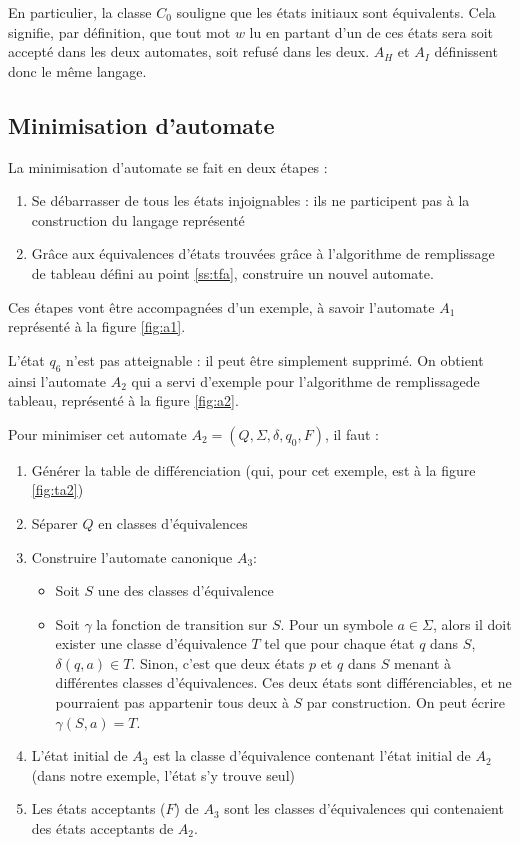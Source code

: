 	 En particulier, la classe $C_0$ souligne que les états initiaux sont équivalents. Cela signifie, par définition, que tout mot $w$ lu en partant d'un de ces états sera soit accepté dans les deux automates, soit refusé dans les deux. $A_H$ et $A_I$ définissent donc le même langage.
	 
	 
	 \subsection{Minimisation d'automate}\label{ss:miniauto}
	 
	 La minimisation d'automate se fait en deux étapes :
	 \begin{enumerate}
	 	\item Se débarrasser de tous les états injoignables : ils ne participent pas à la construction du langage représenté
	 	\item Grâce aux équivalences d'états trouvées grâce à l'algorithme de remplissage de tableau défini au point \ref{ss:tfa}, construire un nouvel automate. 
	 \end{enumerate}
	 
	 Ces étapes vont être accompagnées d'un exemple, à savoir l'automate $A_1$ représenté à la figure \ref{fig:a1}.
	 
	 L'état $q_6$ n'est pas atteignable : il peut être simplement supprimé. On obtient ainsi l'automate $A_2$ qui a servi d'exemple pour l'algorithme de remplissagede tableau, représenté à la figure \ref{fig:a2}.
	 
	 Pour minimiser cet automate $A_2 = (Q, \Sigma, \delta, q_0, F)$, il faut :
	 \begin{enumerate}
	 	\item Générer la table de différenciation (qui, pour cet exemple, est à la figure \ref{fig:ta2})
	 	\item Séparer $Q$ en classes d'équivalences
	 	\item Construire l'automate canonique $A_3$:
	 	\begin{itemize}
	 		\item Soit $S$ une des classes d'équivalence
	 		\item Soit $\gamma$ la fonction de transition sur $S$. Pour un symbole $a \in \Sigma$, alors il doit exister une classe d'équivalence $T$ tel que pour chaque état $q$ dans $S$, $\delta(q,a) \in T$. Sinon, c'est que deux états $p$ et $q$ dans $S$ menant à différentes classes d'équivalences. Ces deux états sont différenciables, et ne pourraient pas appartenir tous deux à $S$ par construction. On peut écrire $\gamma(S,a)=T$.
	 	\end{itemize}
	 	\item L'état initial de $A_3$ est la classe d'équivalence contenant l'état initial de $A_2$ (dans notre exemple, l'état s'y trouve seul)
	 	\item Les états acceptants ($F$) de $A_3$ sont les classes d'équivalences qui contenaient des états acceptants de $A_2$.
	 \end{enumerate}
	 
